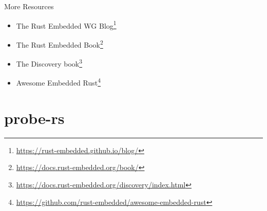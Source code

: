 \documentclass[aspectratio=1610,14pt,t]{beamer}
\begin{document}
\begin{frame}[c]{More Resources}
  \begin{itemize}
    \item The Rust Embedded WG Blog\footnote{\url{https://rust-embedded.github.io/blog/}}
    \item The Rust Embedded Book\footnote{\url{https://docs.rust-embedded.org/book/}}
    \item The Discovery book\footnote{\url{https://docs.rust-embedded.org/discovery/index.html}}
    \item Awesome Embedded Rust\footnote{\url{https://github.com/rust-embedded/awesome-embedded-rust}}
  \end{itemize}
\end{frame}

\section{probe-rs}
\end{document}
